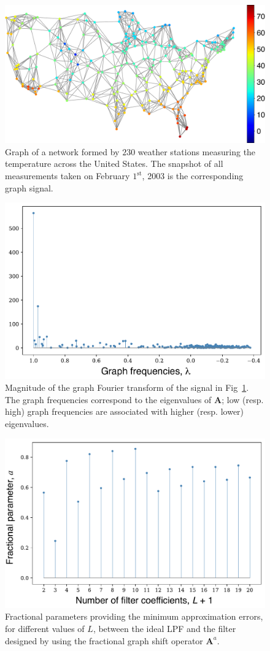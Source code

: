\begin{figure}%
    \centering
    \includegraphics[width=0.6\linewidth]{Figures/GNorm_estacoes_temperatura.pdf}
    \caption{Graph of a network formed by $230$ weather stations measuring the temperature across the United States. The snapshot of all measurements taken on February $1^{\text{st}}$, 2003 is the corresponding graph signal.}%
    \label{fig:usa00}%
    \vspace{0.14cm}
\end{figure}

\begin{figure}[ht!]%
    \centering
    \includegraphics[width=0.5\linewidth]{Figures/GNorm_estacoes_GFT_Temperatura.pdf}%
    \caption{Magnitude of the graph Fourier transform of the signal in Fig~\ref{fig:usa00}. The graph frequencies correspond to the eigenvalues of $\mathbf{A}$; low (resp. high) graph frequencies are associated with higher (resp. lower) eigenvalues.}%
    \label{fig:usa01}%
\end{figure}

\begin{figure}[ht!]
    \centering
    \includegraphics[width=0.5\linewidth]{Figures/ERROR_ordens_fracionarias.pdf}
    \caption{Fractional parameters providing the minimum approximation errors, for different values of $L$, between the ideal LPF and the filter designed by using the fractional graph shift operator $\mathbf{A}^a$.}%
    \label{fig:usa02}%
\end{figure}

